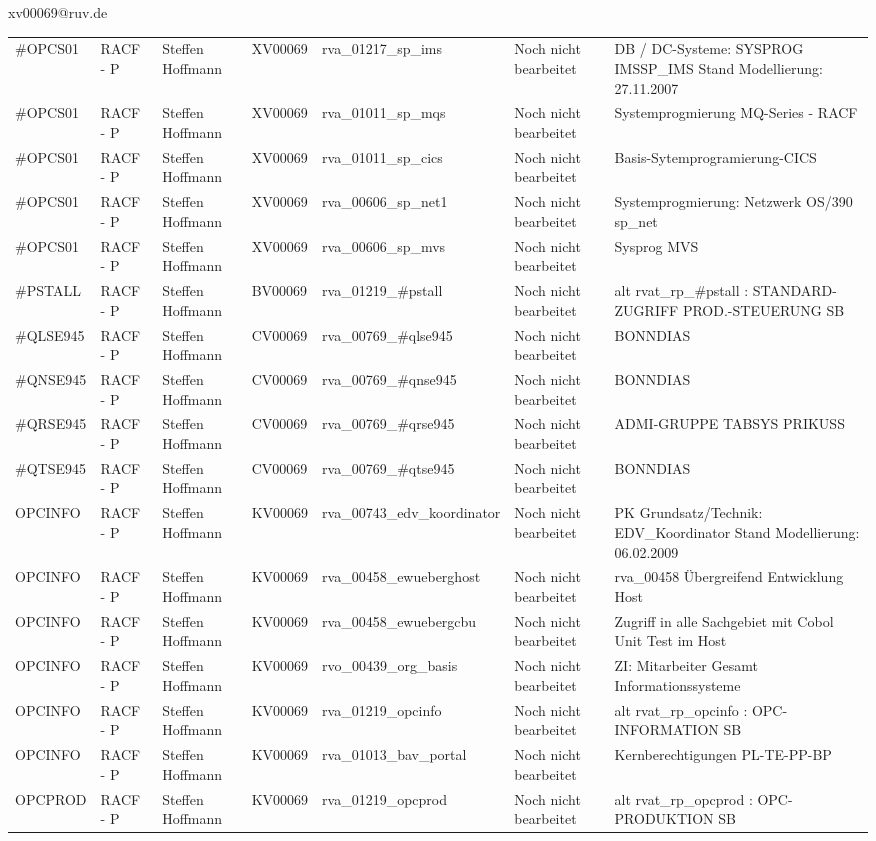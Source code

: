 \documentclass[a4paper,landscape,12pt]{letter}
\begin{document}
\begin{letter}{xv00069@ruv.de\hfill \break}
\begin{tiny}
\begin{longtable}{|p{35mm}|p{15mm}|p{25mm}|p{10mm}|p{40mm}|p{50mm}|p{50mm}|}
\#OPCS01 & RACF - P & Steffen Hoffmann & XV00069 & rva\_01217\_sp\_ims & Noch nicht bearbeitet & DB / DC-Systeme:  SYSPROG IMSSP\_IMS Stand Modellierung: 27.11.2007 \\
\#OPCS01 & RACF - P & Steffen Hoffmann & XV00069 & rva\_01011\_sp\_mqs & Noch nicht bearbeitet & Systemprogmierung MQ-Series - RACF \\
\#OPCS01 & RACF - P & Steffen Hoffmann & XV00069 & rva\_01011\_sp\_cics & Noch nicht bearbeitet & Basis-Sytemprogramierung-CICS \\
\#OPCS01 & RACF - P & Steffen Hoffmann & XV00069 & rva\_00606\_sp\_net1 & Noch nicht bearbeitet & Systemprogmierung: Netzwerk OS/390 sp\_net \\
\#OPCS01 & RACF - P & Steffen Hoffmann & XV00069 & rva\_00606\_sp\_mvs & Noch nicht bearbeitet & Sysprog MVS \\
\#PSTALL & RACF - P & Steffen Hoffmann & BV00069 & rva\_01219\_\#pstall & Noch nicht bearbeitet & alt rvat\_rp\_\#pstall          : STANDARD-ZUGRIFF PROD.-STEUERUNG SB \\
\#QLSE945 & RACF - P & Steffen Hoffmann & CV00069 & rva\_00769\_\#qlse945 & Noch nicht bearbeitet & BONNDIAS \\
\#QNSE945 & RACF - P & Steffen Hoffmann & CV00069 & rva\_00769\_\#qnse945 & Noch nicht bearbeitet & BONNDIAS \\
\#QRSE945 & RACF - P & Steffen Hoffmann & CV00069 & rva\_00769\_\#qrse945 & Noch nicht bearbeitet & ADMI-GRUPPE TABSYS PRIKUSS \\
\#QTSE945 & RACF - P & Steffen Hoffmann & CV00069 & rva\_00769\_\#qtse945 & Noch nicht bearbeitet & BONNDIAS \\
OPCINFO & RACF - P & Steffen Hoffmann & KV00069 & rva\_00743\_edv\_koordinator & Noch nicht bearbeitet & PK Grundsatz/Technik: EDV\_Koordinator Stand Modellierung: 06.02.2009 \\
OPCINFO & RACF - P & Steffen Hoffmann & KV00069 & rva\_00458\_ewueberghost & Noch nicht bearbeitet & rva\_00458 Übergreifend Entwicklung Host \\
OPCINFO & RACF - P & Steffen Hoffmann & KV00069 & rva\_00458\_ewuebergcbu & Noch nicht bearbeitet & Zugriff in alle Sachgebiet mit Cobol Unit Test im Host \\
OPCINFO & RACF - P & Steffen Hoffmann & KV00069 & rvo\_00439\_org\_basis & Noch nicht bearbeitet & ZI: Mitarbeiter Gesamt Informationssysteme \\
OPCINFO & RACF - P & Steffen Hoffmann & KV00069 & rva\_01219\_opcinfo & Noch nicht bearbeitet & alt rvat\_rp\_opcinfo          : OPC- INFORMATION                         SB \\
OPCINFO & RACF - P & Steffen Hoffmann & KV00069 & rva\_01013\_bav\_portal & Noch nicht bearbeitet & Kernberechtigungen PL-TE-PP-BP \\
OPCPROD & RACF - P & Steffen Hoffmann & KV00069 & rva\_01219\_opcprod & Noch nicht bearbeitet & alt rvat\_rp\_opcprod          : OPC-PRODUKTION                           SB \\


\end{longtable}
\end{tiny}
\end{letter}
\end{document}
